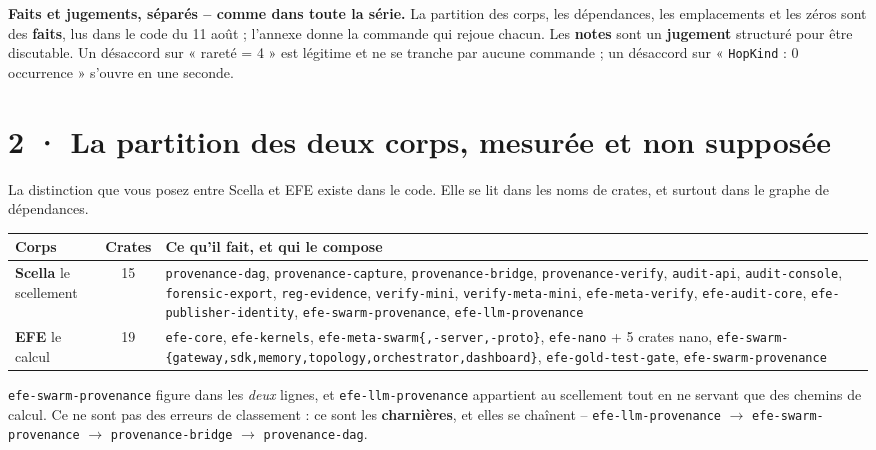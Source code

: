 \documentclass[10pt]{article}
\newcommand{\sz}[1]{{\small\color{grey}\textsf{#1}}}
\newcommand{\code}[1]{\texttt{\small #1}}
\begin{document}
\begin{alerte}
\textbf{Faits et jugements, séparés -- comme dans toute la série.} La partition des corps, les
dépendances, les emplacements et les zéros sont des \textbf{faits}, lus dans le code du 11 août ;
l'annexe donne la commande qui rejoue chacun. Les \textbf{notes} sont un \textbf{jugement} structuré
pour être discutable. Un désaccord sur « rareté = 4 » est légitime et ne se tranche par aucune
commande ; un désaccord sur « \code{HopKind} : 0 occurrence » s'ouvre en une seconde.
\end{alerte}

\section{2 · La partition des deux corps, mesurée et non supposée}

La distinction que vous posez entre Scella et EFE existe dans le code. Elle se lit dans les noms de
crates, et surtout dans le graphe de dépendances.

\renewcommand{\arraystretch}{1.15}
\begin{center}\small
\begin{tabular}{@{}>{\raggedright\arraybackslash}p{2.9cm} c >{\raggedright\arraybackslash}p{11.8cm}@{}}
\toprule
\textbf{Corps} & \sz{Crates} & \textbf{Ce qu'il fait, et qui le compose} \\
\midrule
\textbf{Scella} \sz{le scellement} & 15 &
  \code{provenance-dag}, \code{provenance-capture}, \code{provenance-bridge}, \code{provenance-verify},
  \code{audit-api}, \code{audit-console}, \code{forensic-export}, \code{reg-evidence},
  \code{verify-mini}, \code{verify-meta-mini}, \code{efe-meta-verify}, \code{efe-audit-core},
  \code{efe-publisher-identity}, \code{efe-swarm-provenance}, \code{efe-llm-provenance} \\
\addlinespace[2pt]
\textbf{EFE} \sz{le calcul} & 19 &
  \code{efe-core}, \code{efe-kernels}, \code{efe-meta-swarm\{,-server,-proto\}},
  \code{efe-nano} + 5 crates nano, \code{efe-swarm-\{gateway,sdk,memory,topology,orchestrator,dashboard\}},
  \code{efe-gold-test-gate}, \code{efe-swarm-provenance} \\
\bottomrule
\end{tabular}
\end{center}

\code{efe-swarm-provenance} figure dans les \emph{deux} lignes, et \code{efe-llm-provenance} appartient
au scellement tout en ne servant que des chemins de calcul. Ce ne sont pas des erreurs de classement :
ce sont les \textbf{charnières}, et elles se chaînent --
\code{efe-llm-provenance} $\rightarrow$ \code{efe-swarm-provenance} $\rightarrow$
\code{provenance-bridge} $\rightarrow$ \code{provenance-dag}.
\end{document}
